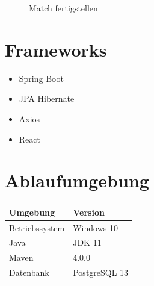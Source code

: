 \begin{figure}[H]
    \centering
    \caption{Match fertigstellen}
\end{figure}
\chapter{Frameworks}
\begin{itemize}
    \item Spring Boot
    \item JPA Hibernate
    \item Axios
    \item React
\end{itemize}
\chapter{Ablaufumgebung}
\begin{table}[H]
    \begin{tabular}{p{}|p{}}
        Umgebung & Version \\
        \hline
        \hline
        Betriebssystem & Windows 10 \\
        Java & JDK 11 \\
        Maven & 4.0.0 \\
        Datenbank & PostgreSQL 13 \\
    \end{tabular}
\end{table}
\clearpage

